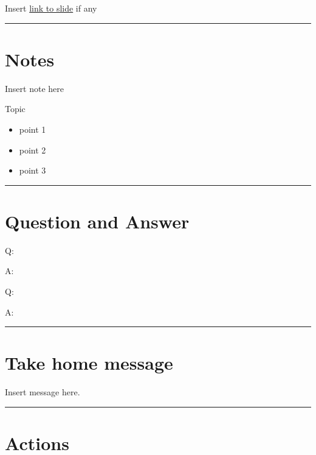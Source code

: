 \documentclass[
]{book}
\providecommand{\tightlist}{%
  \setlength{\itemsep}{0pt}\setlength{\parskip}{0pt}}
\begin{document}
Insert \href{}{link to slide} if any

\begin{center}\rule{0.5\linewidth}{0.5pt}\end{center}

\hypertarget{notes-29}{%
\section*{Notes}\label{notes-29}}

Insert note here

Topic

\begin{itemize}
\tightlist
\item
  point 1
\item
  point 2
\item
  point 3
\end{itemize}

\begin{center}\rule{0.5\linewidth}{0.5pt}\end{center}

\hypertarget{question-and-answer-29}{%
\section*{Question and Answer}\label{question-and-answer-29}}

Q:

A:

Q:

A:

\begin{center}\rule{0.5\linewidth}{0.5pt}\end{center}

\hypertarget{take-home-message-29}{%
\section*{Take home message}\label{take-home-message-29}}

Insert message here.

\begin{center}\rule{0.5\linewidth}{0.5pt}\end{center}

\hypertarget{actions-29}{%
\section*{Actions}\label{actions-29}}
\end{document}
